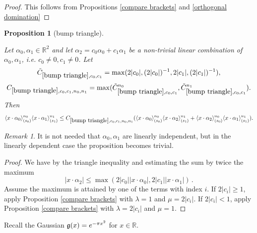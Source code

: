 \documentclass[12pt,reqno]{amsart}
\theoremstyle{plain}
\newtheorem{proposition}[theorem]{Proposition}
\numberwithin{equation}{section}
\theoremstyle{remark}
\newtheorem{rem}{Remark}[section]
\newcommand{\uses}[1]{}
\newcommand{\usesdefs}[1]{}
\newcommand{\leanok}{}
\newcommand{\lean}[1]{}
\newcommand{\R}{{\mathbb R}}
\begin{document}
\begin{proof}
This follows from Propositions \ref{compare brackets} and \ref{orthogonal domination}
\end{proof}

\begin{proposition}[bump triangle]\label{bump triangle}\uses{compare brackets}\usesdefs{bracket bump}
\lean{Auto.bump_triangle}
\leanok
Let $\alpha_0,\alpha_1\in\mathbb{R}^2$ and let $\alpha_2=c_0\alpha_0+c_1\alpha_1$ be a non-trivial linear combination of $\alpha_0,\alpha_1$, i.e. $c_0\not=0, c_1\not=0$.
Let
\begin{equation}\label{auto:bump-triangle-scale-constant}\tilde{C}_{\ref{bump triangle},c_0,c_1}=\max(2|c_0|, (2|c_0|)^{-1},2|c_1|, (2|c_1|)^{-1}),\end{equation}
\begin{equation}\label{auto:bump-triangle-constant}
    C_{\ref{bump triangle},c_0,c_1,n_0,n_1}=\max(\tilde{C}_{\ref{bump triangle},c_0,c_1}^{n_0}, \tilde{C}_{\ref{bump triangle},c_0,c_1}^{n_1}).
\end{equation}
Then
\begin{equation}\label{auto:bump-triangle-bound} \langle x\cdot \alpha_0\rangle_{(s_0)}^{n_0} \langle x\cdot \alpha_1\rangle_{(s_1)}^{n_1}
\le C_{\ref{bump triangle},c_0,c_1,n_0,n_1}(\langle x\cdot \alpha_0\rangle_{(s_0)}^{n_0}\langle x\cdot \alpha_2\rangle_{(s_1)}^{n_1} + \langle x\cdot \alpha_2\rangle_{(s_0)}^{n_0}\langle x\cdot \alpha_1\rangle_{(s_1)}^{n_1}).
\end{equation}
\end{proposition}
\begin{rem}
It is not needed that $\alpha_0,\alpha_1$ are linearly independent, but in the linearly dependent case the proposition becomes trivial.
\end{rem}
\begin{proof}
We have by the triangle inequality and estimating the sum by twice the maximum
\begin{equation}
    |x\cdot \alpha_2|\le \max(2|c_0||x\cdot \alpha_0|,2|c_1||x\cdot \alpha_1|)\, .
\end{equation}
Assume the maximum is attained by one of the terms with index $i$.
If $2|c_i|\ge 1$, apply Proposition \ref{compare brackets} with $\lambda=1$ and $\mu=2|c_i|$.
If $2|c_i|< 1$, apply Proposition \ref{compare brackets} with $\lambda=2|c_i|$ and $\mu=1$.
\end{proof}


Recall the Gaussian $\mathfrak{g}(x)=e^{-\pi x^2}$ for $x\in\R$.
\end{document}
